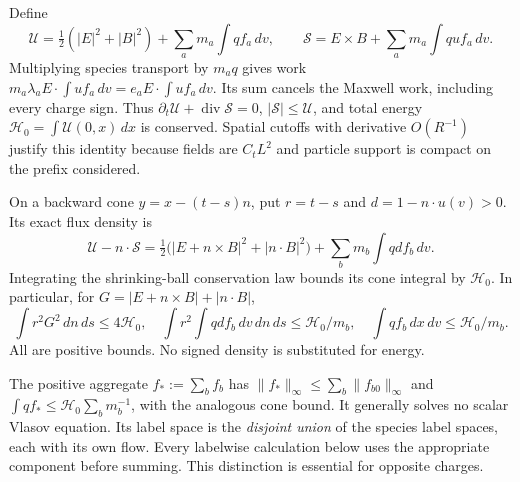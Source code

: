 \documentclass[11pt]{article}
\newcommand{\diver}{\operatorname{div}}
\theoremstyle{remark}\newtheorem{remark}[theorem]{Remark}
\numberwithin{equation}{section}
\begin{document}
Define
\begin{equation}\label{eq:energy}
 \mathcal U=\tfrac12(|E|^2+|B|^2)+\sum_a m_a\int qf_a\,dv,
 \qquad\mathcal S=E\times B+\sum_a m_a\int quf_a\,dv.
\end{equation}
Multiplying species transport by $m_aq$ gives work
$m_a\lambda_a E\cdot\int uf_a\,dv=e_a E\cdot\int uf_a\,dv$.
Its sum cancels the Maxwell work, including every charge sign. Thus
$\partial_t\mathcal U+\diver\mathcal S=0$, $|\mathcal S|\le\mathcal U$,
and total energy $\mathcal H_0=\int\mathcal U(0,x)\,dx$ is conserved.
Spatial cutoffs with derivative $O(R^{-1})$ justify this identity because
fields are $C_tL^2$ and particle support is compact on the prefix considered.

On a backward cone $y=x-(t-s)n$, put $r=t-s$ and
$d=1-n\cdot u(v)>0$. Its exact flux density is
\[
 \mathcal U-n\cdot\mathcal S=
 \tfrac12\bigl(|E+n\times B|^2+|n\cdot B|^2\bigr)
       +\sum_b m_b\int qdf_b\,dv.
\]
Integrating the shrinking-ball conservation law bounds its cone integral
by $\mathcal H_0$. In particular, for $G=|E+n\times B|+|n\cdot B|$,
\begin{equation}\label{eq:budgets}
 \int r^2G^2\,dn\,ds\le4\mathcal H_0,\quad
 \int r^2\int qdf_b\,dv\,dn\,ds\le\mathcal H_0/m_b,
 \quad\int qf_b\,dx\,dv\le\mathcal H_0/m_b.
\end{equation}
All are positive bounds. No signed density is substituted for energy.

The positive aggregate $f_*:=\sum_b f_b$ has
$\|f_*\|_\infty\le\sum_b\|f_{b0}\|_\infty$ and
$\int qf_*\le\mathcal H_0\sum_bm_b^{-1}$, with the analogous cone bound.
It generally solves no scalar Vlasov equation. Its label space is the
\emph{disjoint union} of the species label spaces, each with its own flow.
Every labelwise calculation below uses the appropriate component before
summing. This distinction is essential for opposite charges.
\end{document}
